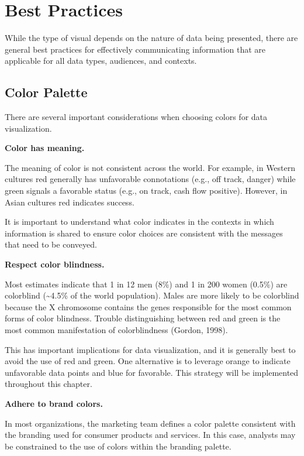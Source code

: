 \documentclass[
]{book}
\begin{document}
\hypertarget{best-practices}{%
\section{Best Practices}\label{best-practices}}

While the type of visual depends on the nature of data being presented, there are general best practices for effectively communicating information that are applicable for all data types, audiences, and contexts.

\hypertarget{color-palette}{%
\subsection{Color Palette}\label{color-palette}}

There are several important considerations when choosing colors for data visualization.

\textbf{Color has meaning.}

The meaning of color is not consistent across the world. For example, in Western cultures red generally has unfavorable connotations (e.g., off track, danger) while green signals a favorable status (e.g., on track, cash flow positive). However, in Asian cultures red indicates success.

It is important to understand what color indicates in the contexts in which information is shared to ensure color choices are consistent with the messages that need to be conveyed.

\textbf{Respect color blindness.}

Most estimates indicate that 1 in 12 men (8\%) and 1 in 200 women (0.5\%) are colorblind (\textasciitilde4.5\% of the world population). Males are more likely to be colorblind because the X chromosome contains the genes responsible for the most common forms of color blindness. Trouble distinguishing between red and green is the most common manifestation of colorblindness (Gordon, 1998).

This has important implications for data visualization, and it is generally best to avoid the use of red and green. One alternative is to leverage orange to indicate unfavorable data points and blue for favorable. This strategy will be implemented throughout this chapter.

\textbf{Adhere to brand colors.}

In most organizations, the marketing team defines a color palette consistent with the branding used for consumer products and services. In this case, analysts may be constrained to the use of colors within the branding palette.
\end{document}
